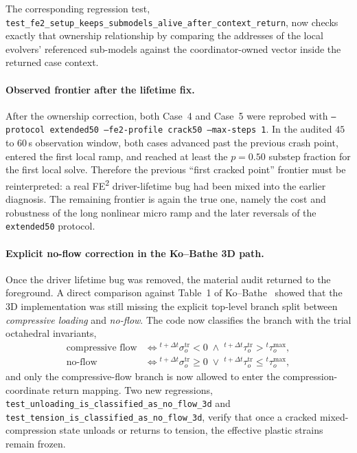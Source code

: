 The corresponding regression test,
\texttt{test\_fe2\_setup\_keeps\_submodels\_alive\_after\_context\_return},
now checks exactly that ownership relationship by comparing the addresses of
the local evolvers' referenced sub-models against the coordinator-owned vector
inside the returned case context.

\paragraph{Observed frontier after the lifetime fix.}
After the ownership correction, both Case~4 and Case~5 were reprobed with
\texttt{--protocol extended50 --fe2-profile crack50 --max-steps 1}.  In the
audited \(45\) to \(60\)\,s observation window, both cases advanced past the
previous crash point, entered the first local ramp, and reached at least the
\(p = 0.50\) substep fraction for the first local solve.  Therefore the
previous ``first cracked point'' frontier must be reinterpreted: a real FE\textsuperscript{2}
driver-lifetime bug had been mixed into the earlier diagnosis.  The remaining
frontier is again the true one, namely the cost and robustness of the long
nonlinear micro ramp and the later reversals of the \texttt{extended50}
protocol.

\paragraph{Explicit no-flow correction in the Ko--Bathe 3D path.}
Once the driver lifetime bug was removed, the material audit returned to the
foreground.  A direct comparison against Table~1 of
Ko--Bathe~\cite{KoBathe2026} showed that the 3D implementation was still
missing the explicit top-level branch split between
\emph{compressive loading} and \emph{no-flow}.  The code now classifies the
branch with the trial octahedral invariants,
\begin{align}
  \text{compressive flow}
  &\iff
  {}^{t+\Delta t}\sigma_o^{\mathrm{tr}} < 0
  \;\wedge\;
  {}^{t+\Delta t}\tau_o^{\mathrm{tr}} > {}^{t}\tau_o^{\max},
  \\
  \text{no-flow}
  &\iff
  {}^{t+\Delta t}\sigma_o^{\mathrm{tr}} \ge 0
  \;\vee\;
  {}^{t+\Delta t}\tau_o^{\mathrm{tr}} \le {}^{t}\tau_o^{\max},
\end{align}
and only the compressive-flow branch is now allowed to enter the
compression-coordinate return mapping.  Two new regressions,
\texttt{test\_unloading\_is\_classified\_as\_no\_flow\_3d} and
\texttt{test\_tension\_is\_classified\_as\_no\_flow\_3d}, verify that once a
cracked mixed-compression state unloads or returns to tension, the effective
plastic strains remain frozen.

